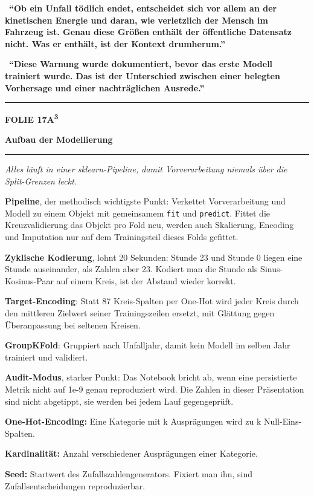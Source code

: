 \documentclass[9pt]{extarticle}
\newcommand{\karte}[3]{%
  \clearpage
  {\color{Accent}\rule{\linewidth}{2.4pt}}\par\vspace{2.5pt}
  {\fontsize{8}{9}\selectfont\bfseries\color{Accent}%
   FOLIE #1\hspace{1.2em}\textbar\hspace{1.2em}#2}\par\vspace{1pt}
  {\fontsize{16}{18}\selectfont\bfseries\color{AccentDark}#3}\par\vspace{3pt}
  {\color{Accent!45}\rule{\linewidth}{0.5pt}}\par\vspace{4pt}%
}
\newcommand{\rubrik}[1]{%
  \vspace{3.5pt}{\fontsize{7.5}{8.5}\selectfont\bfseries\color{Grau}%
  \MakeUppercase{#1}}\par\vspace{1.5pt}}
\newcommand{\kernsatz}[1]{%
  \begin{tcolorbox}[enhanced,sharp corners,boxrule=0pt,
    leftrule=2.2pt,colframe=Accent,colback=AccentPale,
    left=5pt,right=5pt,top=3.5pt,bottom=3.5pt,before skip=1pt,after skip=2pt]
    \color{AccentDark}\itshape #1
  \end{tcolorbox}}
\newcommand{\merksatz}[1]{%
  \vspace{2pt}{\color{KSI}$\blacktriangleright$}\ \textbf{\color{KSI}#1}\par}
\newcommand{\bg}[2]{\item \textbf{#1:} #2}
\begin{document}
\merksatz{\enquote{Ob ein Unfall tödlich endet, entscheidet sich vor allem an der kinetischen
Energie und daran, wie verletzlich der Mensch im Fahrzeug ist. Genau diese Größen enthält der
öffentliche Datensatz nicht. Was er enthält, ist der Kontext drumherum.}}

\merksatz{\enquote{Diese Warnung wurde dokumentiert, bevor das erste Modell trainiert wurde. Das
ist der Unterschied zwischen einer belegten Vorhersage und einer nachträglichen Ausrede.}}

\karte{17}{A\textsuperscript{3}}{Aufbau der Modellierung}

\kernsatz{Alles läuft in einer sklearn-Pipeline, damit Vorverarbeitung niemals über die
Split-Grenzen leckt.}

\rubrik{Sagen}
\begin{sag}
  \item \textbf{Pipeline}, der methodisch wichtigste Punkt: Verkettet Vorverarbeitung und Modell
        zu einem Objekt mit gemeinsamem \texttt{fit} und \texttt{predict}. Fittet die
        Kreuzvalidierung das Objekt pro Fold neu, werden auch Skalierung, Encoding und Imputation
        nur auf dem Trainingsteil dieses Folds gefittet.
  \item \textbf{Zyklische Kodierung}, lohnt 20 Sekunden: Stunde 23 und Stunde 0 liegen eine Stunde
        auseinander, als Zahlen aber 23. Kodiert man die Stunde als Sinus-Kosinus-Paar auf einem
        Kreis, ist der Abstand wieder korrekt.
  \item \textbf{Target-Encoding}: Statt 87 Kreis-Spalten per One-Hot wird jeder Kreis durch den
        mittleren Zielwert seiner Trainingszeilen ersetzt, mit Glättung gegen Überanpassung
        bei seltenen Kreisen.
  \item \textbf{GroupKFold}: Gruppiert nach Unfalljahr, damit kein Modell im selben Jahr trainiert
        und validiert.
  \item \textbf{Audit-Modus}, starker Punkt: Das Notebook bricht ab, wenn eine persistierte Metrik
        nicht auf 1e-9 genau reproduziert wird. Die Zahlen in dieser Präsentation sind nicht
        abgetippt, sie werden bei jedem Lauf gegengeprüft.
\end{sag}

\rubrik{Begriffe}
\begin{begriff}
  \bg{One-Hot-Encoding}{Eine Kategorie mit k Ausprägungen wird zu k Null-Eins-Spalten.}
  \bg{Kardinalität}{Anzahl verschiedener Ausprägungen einer Kategorie.}
  \bg{Seed}{Startwert des Zufallszahlengenerators. Fixiert man ihn, sind Zufallsentscheidungen
      reproduzierbar.}
\end{begriff}
\end{document}
